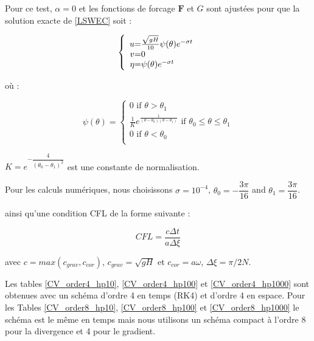 Pour ce test, $\alpha = 0$ et les fonctions de forcage $\mathbf{F}$ et $G$ sont ajustées pour que la solution exacte de \eqref{LSWEC} soit :

\begin{equation}
\left\lbrace
\begin{array}{r @{=} l}
u & \frac{\sqrt{gH}}{10} \psi ( \theta )  e^{-\sigma t} \\
v & 0 \\
\eta & \psi( \theta ) e^{-\sigma t}
\end{array}
\right.
\end{equation}

où :

\begin{equation*}
\psi ( \theta ) = 
\left\lbrace
\begin{array}{l}
0 \text{ if } \theta > \theta_1\\
\frac{1}{K}e^{\frac{1}{(\theta - \theta_0)(\theta-\theta_1)}} \text{ if } \theta_0 \leq \theta \leq \theta_1 \\
0 \text{ if } \theta < \theta_0\\
 
\end{array}
\right.
\label{galewski_fun}
\end{equation*}

$K = e^{-\dfrac{4}{(\theta_0 - \theta_1)^2}}$ est une constante de normalisation.

Pour les calculs numériques, nous choisissons $\sigma = 10^{-4}$, $\theta_0 = -\dfrac{3 \pi}{16}$ and $\theta_1 = \dfrac{3 \pi}{16}$.

ainsi qu'une condition CFL de la forme suivante :

\begin{equation}
CFL = \dfrac{c \Delta t}{a \Delta \xi}
\end{equation}

avec $c = max(c_{grav}, c_{cor})$, $c_{grav} = \sqrt{gH}$ et $c_{cor} = a \omega$, $\Delta \xi = \pi / 2N$.

Les tables \ref{CV_order4_hp10}, \ref{CV_order4_hp100} et \ref{CV_order4_hp1000} sont obtenues avec un schéma d'ordre 4 en temps (RK4) et d'ordre 4 en espace. Pour les Tables \ref{CV_order8_hp10}, \ref{CV_order8_hp100} et \ref{CV_order8_hp1000} le schéma est le même en temps mais nous utilisons un schéma compact à l'ordre 8 pour la divergence et 4 pour le gradient.


